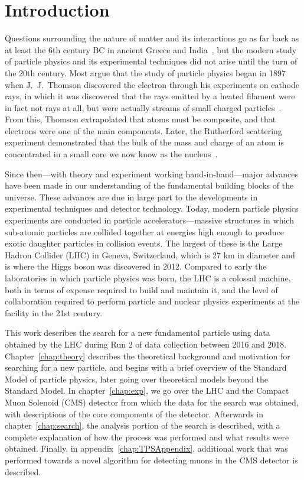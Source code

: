 
\chapter{Introduction}

Questions surrounding the nature of matter and its interactions go as far back as at least the 6th century BC in ancient Greece and India~\cite{PhysNuclphys196p}, but the modern study of particle physics and its experimental techniques did not arise until the turn of the 20th century.
Most argue that the study of particle physics began in 1897 when J.\ J.\ Thomson discovered the electron through his experiments on cathode rays, in which it was discovered that the rays emitted by a heated filament were in fact not rays at all, but were actually streams of small charged particles~\cite{GriffithsParticle}.
From this, Thomson extrapolated that atoms must be composite, and that electrons were one of the main components.
Later, the Rutherford scattering experiment demonstrated that the bulk of the mass and charge of an atom is concentrated in a small core we now know as the nucleus~\cite{BargerCollider}.


Since then---with theory and experiment working hand-in-hand---major advances have been made in our understanding of the fundamental building blocks of the universe.
These advances are due in large part to the developments in experimental techniques and detector technology.
Today, modern particle physics experiments are conducted in particle accelerators---massive structures in which sub-atomic particles are collided together at energies high enough to produce exotic daughter particles in collision events.
The largest of these is the Large Hadron Collider (LHC) in Geneva, Switzerland, which is 27 km in diameter and is where the Higgs boson was discovered in 2012.
Compared to early the laboratories in which particle physics was born, the LHC is a colossal machine, both in terms of expense required to build and maintain it, and the level of collaboration required to perform particle and nuclear physics experiments at the facility in the 21st century.

This work describes the search for a new fundamental particle using data obtained by the LHC during Run 2 of data collection between 2016 and 2018.
Chapter~\ref{chap:theory} describes the theoretical background and motivation for searching for a new particle, and begins with a brief overview of the Standard Model of particle physics, later going over theoretical models beyond the Standard Model.
In chapter~\ref{chap:exp}, we go over the LHC and the Compact Muon Solenoid (CMS) detector from which the data for the search was obtained, with descriptions of the core components of the detector.
Afterwards in chapter~\ref{chap:search}, the analysis portion of the search is described, with a complete explanation of how the process was performed and what results were obtained.
Finally, in appendix~\ref{chap:TPSAppendix}, additional work that was performed towards a novel algorithm for detecting muons in the CMS detector is described.
